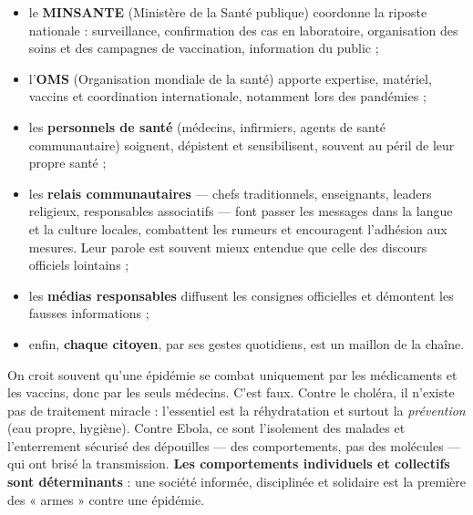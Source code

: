 \documentclass[11pt]{article}
\begin{document}
\begin{itemize}
\item le \textbf{MINSANTE} (Ministère de la Santé publique) coordonne la riposte nationale : surveillance, confirmation des cas en laboratoire, organisation des soins et des campagnes de vaccination, information du public ;
\item l'\textbf{OMS} (Organisation mondiale de la santé) apporte expertise, matériel, vaccins et coordination internationale, notamment lors des pandémies ;
\item les \textbf{personnels de santé} (médecins, infirmiers, agents de santé communautaire) soignent, dépistent et sensibilisent, souvent au péril de leur propre santé ;
\item les \textbf{relais communautaires} — chefs traditionnels, enseignants, leaders religieux, responsables associatifs — font passer les messages dans la langue et la culture locales, combattent les rumeurs et encouragent l'adhésion aux mesures. Leur parole est souvent mieux entendue que celle des discours officiels lointains ;
\item les \textbf{médias responsables} diffusent les consignes officielles et démontent les fausses informations ;
\item enfin, \textbf{chaque citoyen}, par ses gestes quotidiens, est un maillon de la chaîne.
\end{itemize}

\begin{attention}
On croit souvent qu'une épidémie se combat uniquement par les médicaments et les vaccins, donc par les seuls médecins. C'est faux. Contre le choléra, il n'existe pas de traitement miracle : l'essentiel est la réhydratation et surtout la \emph{prévention} (eau propre, hygiène). Contre Ebola, ce sont l'isolement des malades et l'enterrement sécurisé des dépouilles — des comportements, pas des molécules — qui ont brisé la transmission. \textbf{Les comportements individuels et collectifs sont déterminants} : une société informée, disciplinée et solidaire est la première des « armes » contre une épidémie.
\end{attention}
\end{document}

